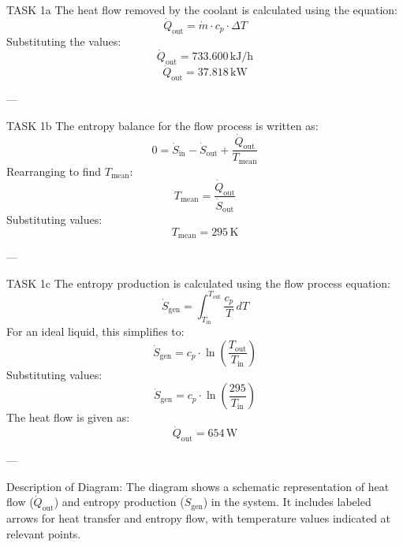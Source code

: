 TASK 1a  
The heat flow removed by the coolant is calculated using the equation:  
\[
\dot{Q}_{\text{out}} = \dot{m} \cdot c_p \cdot \Delta T
\]  
Substituting the values:  
\[
\dot{Q}_{\text{out}} = 733.600 \, \text{kJ/h}
\]  
\[
\dot{Q}_{\text{out}} = 37.818 \, \text{kW}
\]  

---

TASK 1b  
The entropy balance for the flow process is written as:  
\[
0 = \dot{S}_{\text{in}} - \dot{S}_{\text{out}} + \frac{\dot{Q}_{\text{out}}}{T_{\text{mean}}}
\]  
Rearranging to find \( T_{\text{mean}} \):  
\[
T_{\text{mean}} = \frac{\dot{Q}_{\text{out}}}{\dot{S}_{\text{out}}}
\]  
Substituting values:  
\[
T_{\text{mean}} = 295 \, \text{K}
\]  

---

TASK 1c  
The entropy production is calculated using the flow process equation:  
\[
\dot{S}_{\text{gen}} = \int_{T_{\text{in}}}^{T_{\text{out}}} \frac{c_p}{T} \, dT
\]  
For an ideal liquid, this simplifies to:  
\[
\dot{S}_{\text{gen}} = c_p \cdot \ln\left(\frac{T_{\text{out}}}{T_{\text{in}}}\right)
\]  
Substituting values:  
\[
\dot{S}_{\text{gen}} = c_p \cdot \ln\left(\frac{295}{T_{\text{in}}}\right)
\]  
The heat flow is given as:  
\[
\dot{Q}_{\text{out}} = 654 \, \text{W}
\]  

---

Description of Diagram:  
The diagram shows a schematic representation of heat flow (\( \dot{Q}_{\text{out}} \)) and entropy production (\( \dot{S}_{\text{gen}} \)) in the system. It includes labeled arrows for heat transfer and entropy flow, with temperature values indicated at relevant points.
